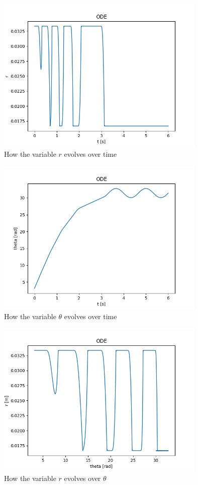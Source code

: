 \begin{figure}[ht]
	\centering
	\includegraphics[width=10cm]{img/simulation/r_t.png}
	\caption{How the variable $r$ evolves over time}
	\label{fig:r t diagram}
\end{figure}

\begin{figure}[ht]
	\centering
	\includegraphics[width=10cm]{img/simulation/theta_t.png}
	\caption{How the variable $\theta$ evolves over time}
	\label{fig:theta t diagram}
\end{figure}

\begin{figure}[ht]
	\centering
	\includegraphics[width=10cm]{img/simulation/r_theta_t.png}
	\caption{How the variable $r$ evolves over $\theta$}
	\label{fig:r theta}
\end{figure}

